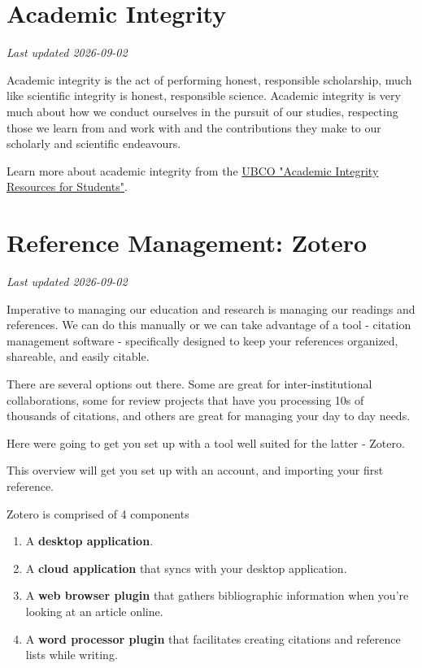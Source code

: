 \documentclass[
]{book}
\providecommand{\tightlist}{%
  \setlength{\itemsep}{0pt}\setlength{\parskip}{0pt}}
\begin{document}
\chapter{Academic Integrity}\label{academic-integrity}

\emph{Last updated 2026-09-02}

Academic integrity is the act of performing honest, responsible scholarship, much like scientific integrity is honest, responsible science. Academic integrity is very much about how we conduct ourselves in the pursuit of our studies, respecting those we learn from and work with and the contributions they make to our scholarly and scientific endeavours.

Learn more about academic integrity from the \href{https://students.ok.ubc.ca/academic-success/learning-hub/online-resources/academic-integrity/}{UBCO "Academic Integrity Resources for Students"}.

\chapter{Reference Management: Zotero}\label{reference-management-zotero}

\emph{Last updated 2026-09-02}

Imperative to managing our education and research is managing our readings and references. We can do this manually or we can take advantage of a tool - citation management software - specifically designed to keep your references organized, shareable, and easily citable.

There are several options out there. Some are great for inter-institutional collaborations, some for review projects that have you processing 10s of thousands of citations, and others are great for managing your day to day needs.

Here we\textquotesingle re going to get you set up with a tool well suited for the latter - Zotero.

This overview will get you set up with an account, and importing your first reference.

Zotero is comprised of 4 components

\begin{enumerate}
\def\labelenumi{\arabic{enumi}.}
\tightlist
\item
  A \textbf{desktop application}.
\item
  A \textbf{cloud application} that syncs with your desktop application.
\item
  A \textbf{web browser plugin} that gathers bibliographic information when you're looking at an article online.
\item
  A \textbf{word processor plugin} that facilitates creating citations and reference lists while writing.
\end{enumerate}
\end{document}
